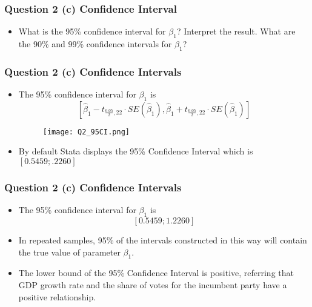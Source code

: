 \documentclass[11pt, xcolor=x11names,compress]{beamer}
\begin{document}
\begin{frame}[fragile,t]
\frametitle{Question 2 (c) Confidence Interval} 
\linespread{1.15}
\begin{itemize}
    \item What is the 95\% confidence interval for  $\beta_1$? Interpret the result. What are the 90\% and 99\% confidence intervals for $\beta_1$?
\end{itemize}
\hyperlink{CIs}{}
\end{frame}

\begin{frame}[fragile,t]
\frametitle{Question 2 (c) Confidence Intervals} 
\linespread{1.15}
\begin{itemize}
    \item The 95\% confidence interval for  $\beta_1$ is
$$
\left[\widehat{\beta}_{1} - t_{\frac{0.05}{2}, 22} \cdot S E\left(\widehat{\beta}_{1}\right),\widehat{\beta}_{1} + t_{\frac{0.05}{2}, 22} \cdot SE\left(\widehat{\beta}_{1}\right)\right]
$$
\begin{figure}
    \centering
    \texttt{[image: Q2\_95CI.png]}
\end{figure}
    \item By default Stata displays the 95\% Confidence Interval which is $[0.5459; .2260]$
\end{itemize}
\end{frame}

\begin{frame}[fragile,t]
\frametitle{Question 2 (c) Confidence Intervals} 
\linespread{1.3}
\begin{itemize}
    \item The 95\% confidence interval for  $\beta_1$ is
$$
[0.5459; 1.2260]
$$
    \item In repeated samples, 95\% of the intervals constructed in this way will contain the true value of parameter $\beta_1$.
    \item The lower bound of the 95\% Confidence Interval is positive, referring that GDP growth rate and the share of votes for the incumbent party have a positive relationship.
\end{itemize}
\end{frame}
\end{document}
